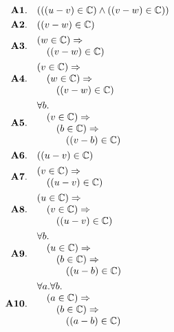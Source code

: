 \documentclass[11pt]{article}
\theoremstyle{plain}
\begin{document}
\begin{align*}
  \mathbf{A1.}\quad & (((u - v) \in \mathbb{C}) \wedge ((v - w) \in \mathbb{C})) \\
  \mathbf{A2.}\quad & ((v - w) \in \mathbb{C}) \\
  \mathbf{A3.}\quad & \begin{array}{@{}l@{}} (w \in \mathbb{C}) \Rightarrow  \\ \quad ((v - w) \in \mathbb{C}) \end{array} \\
  \mathbf{A4.}\quad & \begin{array}{@{}l@{}} (v \in \mathbb{C}) \Rightarrow  \\ \quad (w \in \mathbb{C}) \Rightarrow  \\ \quad \quad ((v - w) \in \mathbb{C}) \end{array} \\
  \mathbf{A5.}\quad & \begin{array}{@{}l@{}} \forall b. \\ \quad (v \in \mathbb{C}) \Rightarrow  \\ \quad \quad (b \in \mathbb{C}) \Rightarrow  \\ \quad \quad \quad ((v - b) \in \mathbb{C}) \end{array} \\
  \mathbf{A6.}\quad & ((u - v) \in \mathbb{C}) \\
  \mathbf{A7.}\quad & \begin{array}{@{}l@{}} (v \in \mathbb{C}) \Rightarrow  \\ \quad ((u - v) \in \mathbb{C}) \end{array} \\
  \mathbf{A8.}\quad & \begin{array}{@{}l@{}} (u \in \mathbb{C}) \Rightarrow  \\ \quad (v \in \mathbb{C}) \Rightarrow  \\ \quad \quad ((u - v) \in \mathbb{C}) \end{array} \\
  \mathbf{A9.}\quad & \begin{array}{@{}l@{}} \forall b. \\ \quad (u \in \mathbb{C}) \Rightarrow  \\ \quad \quad (b \in \mathbb{C}) \Rightarrow  \\ \quad \quad \quad ((u - b) \in \mathbb{C}) \end{array} \\
  \mathbf{A10.}\quad & \begin{array}{@{}l@{}} \forall a. \forall b. \\ \quad (a \in \mathbb{C}) \Rightarrow  \\ \quad \quad (b \in \mathbb{C}) \Rightarrow  \\ \quad \quad \quad ((a - b) \in \mathbb{C}) \end{array} \\

\end{align*}
\end{document}
